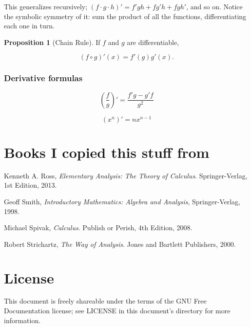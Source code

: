 \documentclass{article}
\theoremstyle{definition}
\newtheorem{proposition}{Proposition}[section]
\begin{document}
This generalizes recursively; $(f \cdot g \cdot h)' = f'gh + fg'h + fgh'$, and
so on. Notice the symbolic symmetry of it: sum the product of all the functions,
differentiating each one in turn.

\begin{proposition}[Chain Rule]

If $f$ and $g$ are differentiable,

\begin{equation}
(f \circ g)'(x) = f'(g)g'(x).
\end{equation}


\end{proposition}

\subsubsection{Derivative formulas}

\begin{equation}
\left(\frac{f}{g}\right)' = \frac{f'g - g'f}{g^2}
\end{equation}

\begin{equation}
(x^n)' = nx^{n-1}
\end{equation}

\section{Books I copied this stuff from} \label{bibliography}

\begin{thebibliography}{9}

  Kenneth A. Ross,
  \emph{Elementary Analysis: The Theory of Calculus}.
  Springer-Verlag,
  1st Edition,
  2013.

  Geoff Smith,
  \emph{Introductory Mathematics: Algebra and Analysis},
  Springer-Verlag,
  1998.

  Michael Spivak,
  \emph{Calculus}.
  Publish or Perish,
  4th Edition,
  2008.

  Robert Strichartz,
  \emph{The Way of Analysis}.
  Jones and Bartlett Publishers,
  2000.
  
\end{thebibliography}

\section{License}

This document is freely shareable under the terms of the GNU Free Documentation
license; see LICENSE in this document's directory for more information.
\end{document}
